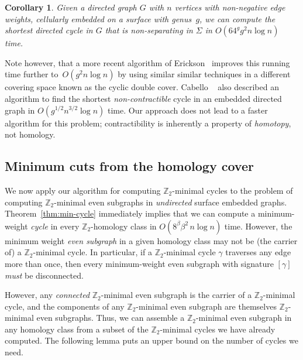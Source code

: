 \documentclass[11pt,twoside]{article}
\def\Z{\mathbb{Z}}
\newtheorem{corollary}[theorem]{Corollary}
\begin{document}
{\begin{corollary}
\label{C:nonsep}
Given a directed graph $G$ with $n$ vertices with non-negative edge weights, cellularly embedded on a surface with genus~$g$, we can compute the shortest directed cycle in $G$ that is non-separating in $\Sigma$ in $O(64^g g^2 n\log n)$ time.
\end{corollary}

Note however, that a more recent algorithm of Erickson~\cite{e-sncds-11} improves this running time further to~$O(g^2 n \log n)$ by using similar similar techniques in a different covering space known as the cyclic double cover.
Cabello \etal~\cite{ccl-fsncd-10} also described an algorithm to find the shortest \emph{non-contractible} cycle in an embedded directed graph in $O(g^{1/2} n^{3/2}\log n)$ time.  Our approach does not lead to a faster algorithm for this problem;  contractibility is inherently  a property of \emph{homotopy}, not homology.

\subsection{Minimum cuts from the homology cover}
\label{sec:homcover_mincut}

We now apply our algorithm for computing $\Z_2$-minimal cycles to the problem of computing $\Z_2$-minimal even subgraphs in \emph{undirected} surface embedded graphs.
Theorem~\ref{thm:min-cycle} immediately implies that we can compute a minimum-weight \emph{cycle} in every $\Z_2$-homology class in $O(8^\beta \beta^2\, n\log n)$ time.  However, the minimum weight \emph{even subgraph} in a given homology class may not be (the carrier of) a $\Z_2$-minimal cycle.  In particular, if a $\Z_2$-minimal cycle $\gamma$ traverses any edge more than once, then every minimum-weight even subgraph with signature $[\gamma]$ \emph{must} be disconnected.

However, any \emph{connected} $\Z_2$-minimal even subgraph is the carrier of a $\Z_2$-minimal cycle, and the components of any $\Z_2$-minimal even subgraph are themselves $\Z_2$-minimal even subgraphs.  Thus, we can assemble a $\Z_2$-minimal even subgraph in any homology class from a subset of the $\Z_2$-minimal cycles we have already computed.  The following lemma puts an upper bound on the number of cycles we need.

}
\end{document}
